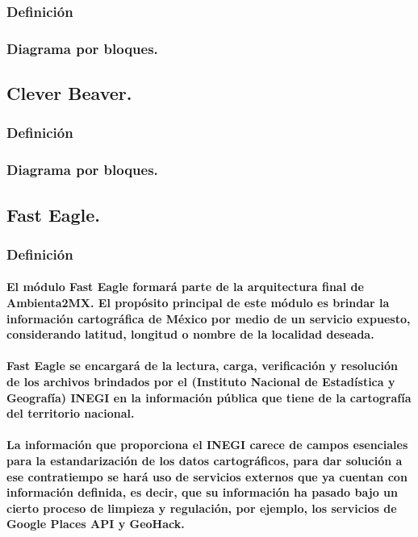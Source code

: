   	\subsubsection{Definición}
  	\subsubsection{Diagrama por bloques.}
  \subsection{Clever Beaver.}
  	\subsubsection{Definición}
  	\subsubsection{Diagrama por bloques.}
  \subsection{Fast Eagle.}
	  \subsubsection{Definición}
	  	\paragraph{El módulo Fast Eagle formará parte de la arquitectura final de Ambienta2MX. El propósito principal de este módulo es brindar la información cartográfica de México por medio de un servicio expuesto, considerando latitud, longitud o nombre de la localidad deseada.}
  		\paragraph{Fast Eagle se encargará de la lectura, carga, verificación y resolución de los archivos brindados por el (Instituto Nacional de Estadística y Geografía) INEGI en la información pública que tiene de la cartografía del territorio nacional.}
	  	\paragraph{La información que proporciona el INEGI carece de campos esenciales para la estandarización de los datos cartográficos, para dar solución a ese contratiempo se hará uso de servicios externos que ya cuentan con información definida, es decir, que su información ha pasado bajo un cierto proceso de limpieza y regulación, por ejemplo, los servicios de Google Places API y GeoHack.}
